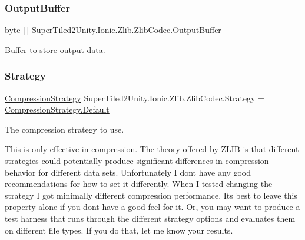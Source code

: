 \subsubsection{\texorpdfstring{Output\+Buffer}{OutputBuffer}}
{\footnotesize\ttfamily byte \mbox{[}$\,$\mbox{]} Super\+Tiled2\+Unity.\+Ionic.\+Zlib.\+Zlib\+Codec.\+Output\+Buffer}



Buffer to store output data. 

\mbox{\label{class_super_tiled2_unity_1_1_ionic_1_1_zlib_1_1_zlib_codec_a3fd796243c20c482c781744e0e651519}} 
\subsubsection{\texorpdfstring{Strategy}{Strategy}}
{\footnotesize\ttfamily \mbox{\hyperlink{namespace_super_tiled2_unity_1_1_ionic_1_1_zlib_abde5c10a1e2ee453e1e8e22e79a39a3b}{Compression\+Strategy}} Super\+Tiled2\+Unity.\+Ionic.\+Zlib.\+Zlib\+Codec.\+Strategy = \mbox{\hyperlink{namespace_super_tiled2_unity_1_1_ionic_1_1_zlib_a20f6771804996c363f454ad9765cd7dba7a1920d61156abc05a60135aefe8bc67}{Compression\+Strategy.\+Default}}}



The compression strategy to use. 

This is only effective in compression. The theory offered by Z\+L\+IB is that different strategies could potentially produce significant differences in compression behavior for different data sets. Unfortunately I don\textquotesingle{}t have any good recommendations for how to set it differently. When I tested changing the strategy I got minimally different compression performance. It\textquotesingle{}s best to leave this property alone if you don\textquotesingle{}t have a good feel for it. Or, you may want to produce a test harness that runs through the different strategy options and evaluates them on different file types. If you do that, let me know your results. \mbox{\label{class_super_tiled2_unity_1_1_ionic_1_1_zlib_1_1_zlib_codec_a391c4ea8048d19b0784929372149a200}} 
